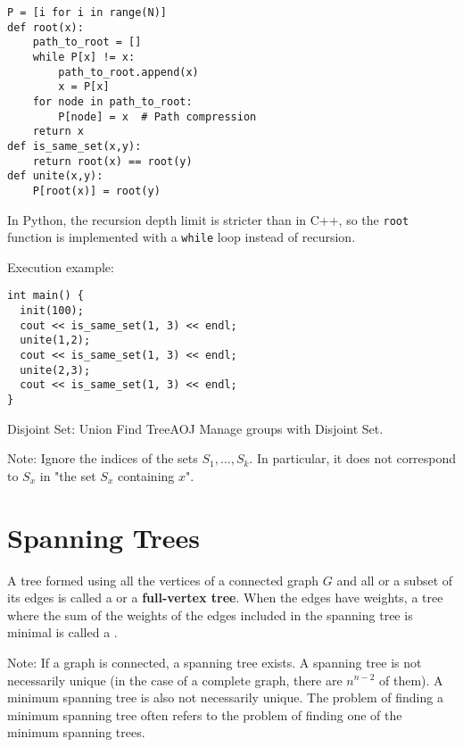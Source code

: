 \begin{pybox}[emph={root,is\_same\_set,unite}]
\begin{verbatim}
P = [i for i in range(N)]
def root(x):
    path_to_root = []
    while P[x] != x:
        path_to_root.append(x)
        x = P[x]
    for node in path_to_root:
        P[node] = x  # Path compression
    return x
def is_same_set(x,y):
    return root(x) == root(y)
def unite(x,y):
    P[root(x)] = root(y)
\end{verbatim}
\end{pybox}
In Python, the recursion depth limit is stricter than in C++, so the \texttt{root} function is implemented with a \texttt{while} loop instead of recursion.


Execution example:

\begin{cbox}
\begin{verbatim}
int main() {
  init(100);
  cout << is_same_set(1, 3) << endl;
  unite(1,2);
  cout << is_same_set(1, 3) << endl;
  unite(2,3);
  cout << is_same_set(1, 3) << endl;
}
\end{verbatim}
\end{cbox}

\begin{psbox}{Disjoint Set: Union Find Tree}{AOJ}
Manage groups with Disjoint Set.

Note: Ignore the indices of the sets $S_1,\ldots,S_k$. In particular, it does not correspond to $S_x$ in "the set $S_x$ containing $x$".

\end{psbox}
\section{Spanning Trees}

A tree formed using all the vertices of a connected graph $G$ and all or a subset of its edges is called a  or a \textbf{full-vertex tree}.
When the edges have weights, a tree where the sum of the weights of the edges included in the spanning tree is minimal is called a .

Note: If a graph is connected, a spanning tree exists. A spanning tree is not necessarily unique (in the case of a complete graph, there are $n^{n-2}$ of them). A minimum spanning tree is also not necessarily unique. The problem of finding a minimum spanning tree often refers to the problem of finding one of the minimum spanning trees.

